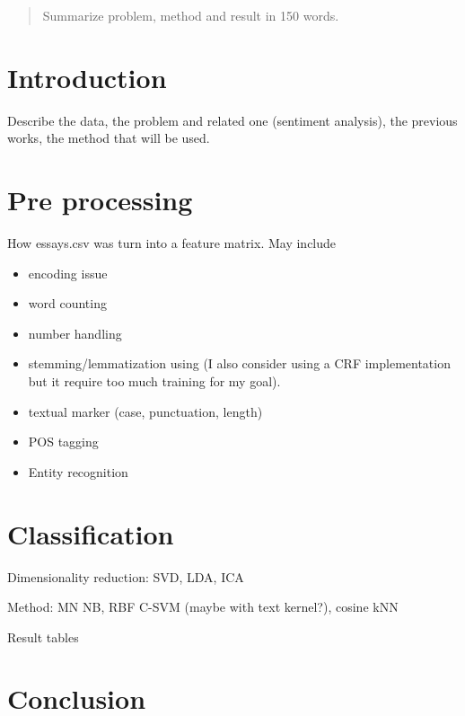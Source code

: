 \begin{abstract}
	Summarize problem, method and result in 150 words.
\end{abstract}

\section{Introduction}
Describe the data, the problem and related one (sentiment analysis), the
previous works\cite{mairesse2007perso}, the method that will be used.

\section{Pre processing}
How essays.csv was turn into a feature matrix. May include
\begin{itemize}
\item encoding issue
\item word counting
\item number handling
\item stemming/lemmatization using \autocite{bird2009nltk} (I also consider
	using a CRF implementation \autocite[for instance][]{CRFsuite} but it
	require too much training for my goal).
\item textual marker (case, punctuation, length)
\item POS tagging
\item Entity recognition
\end{itemize}

\section{Classification}
Dimensionality reduction: SVD, LDA, ICA

Method: MN NB, RBF C-SVM (maybe with text kernel?), cosine kNN

Result tables

\section{Conclusion}
